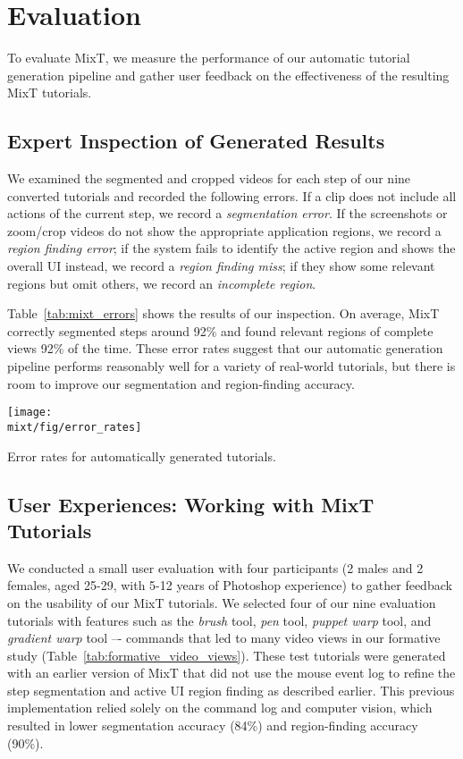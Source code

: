 \section{Evaluation}
\label{mixt_evaluation}

To evaluate MixT, we measure the performance of our automatic tutorial generation pipeline and gather user feedback on the effectiveness of the resulting MixT tutorials.

\subsection{Expert Inspection of Generated Results}
We examined the segmented and cropped videos for each step of our nine converted tutorials and recorded the following errors. If a clip does not include all actions of the current step, we record a \emph{segmentation error}. If the screenshots or zoom/crop videos do not show the appropriate application regions, we record a \emph{region finding error}; if the system fails to identify the active region and shows the overall UI instead, we record a \emph{region finding miss}; if they show some relevant regions but omit others, we record an \emph{incomplete region}.

Table~\ref{tab:mixt_errors} shows the results of our inspection. On average, MixT correctly segmented steps around 92\% and found relevant regions of complete views 92\% of the time. These error rates suggest that our automatic generation pipeline performs reasonably well for a variety of real-world tutorials, but there is room to improve our segmentation and region-finding accuracy.

\begin{table}
  \centering
  \texttt{[image: \\mixt/fig/error\_rates]}
  \caption{Error rates for automatically generated tutorials.}
  \label{tab:mixt_errors}
\end{table}


\subsection{User Experiences: Working with MixT Tutorials}
We conducted a small user evaluation with four participants (2 males and 2 females, aged 25-29, with 5-12 years of Photoshop experience) to gather feedback on the usability of our MixT tutorials. We selected four of our nine evaluation tutorials with features such as the \emph{brush} tool, \emph{pen} tool, \emph{puppet warp} tool, and \emph{gradient warp} tool –- commands that led to many video views in our formative study (Table~\ref{tab:formative_video_views}). These test tutorials were generated with an earlier version of MixT that did not use the mouse event log to refine the step segmentation and active UI region finding as described earlier. This previous implementation relied solely on the command log and computer vision, which resulted in lower segmentation accuracy (84\%) and region-finding accuracy (90\%).

